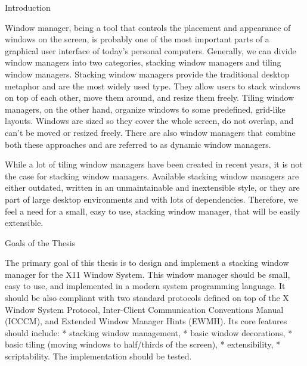 \chap Introduction

Window manager, being a tool that controls the placement and appearance of windows on the screen,
is probably one of the most important parts of a graphical user interface of today's personal computers.
Generally, we can divide window managers into two categories, stacking window managers and tiling window managers.
Stacking window managers provide the traditional desktop metaphor and are the most widely used type.
They allow users to stack windows on top of each other, move them around, and resize them freely.
Tiling window managers, on the other hand, organize windows to some predefined, grid-like layouts.
Windows are sized so they cover the whole screen, do not overlap, and can't be moved or resized freely.
There are also window managers that combine both these approaches and are referred to as dynamic window managers.

While a lot of tiling window managers have been created in recent years, it is not the case for stacking window managers.
Available stacking window managers are either outdated, written in an unmaintainable and inextensible style, or they are
part of large desktop environments and with lots of dependencies.
Therefore, we feel a need for a small, easy to use, stacking window manager, that will be easily extensible.


\nonum
\sec Goals of the Thesis

The primary goal of this thesis is to design and implement a stacking window manager for the X11 Window System.
This window manager should be small, easy to use, and implemented in a modern system programming language.
It should be also compliant with two standard protocols defined on top of the X Window System Protocol,
Inter-Client Communication Conventions Manual (ICCCM), and Extended Window Manager Hints (EWMH).
Its core features should include:
\begitems
* stacking window management,
* basic window decorations,
* basic tiling (moving windows to half/thirds of the screen),
* extensibility,
* scriptability.
\enditems
The implementation should be tested.

